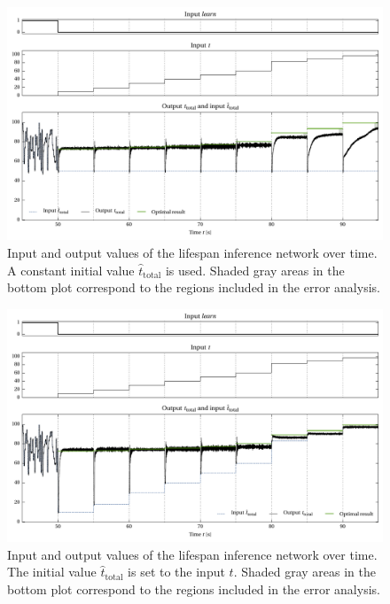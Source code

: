 \documentclass[a4paper,11pt]{article}
\begin{document}
\begin{figure}
	\centering
	\includegraphics{media/net_lifespan_gaussian_10_const_0.pdf}
	\caption{Input and output values of the lifespan inference network over time. A constant initial value $\hat t_\mathrm{total}$ is used. Shaded gray areas in the bottom plot correspond to the regions included in the error analysis.}
	\label{fig:net_lifespan_const}
\end{figure}
\begin{figure}
	\centering
	\includegraphics{media/net_lifespan_gaussian_10_t_0.pdf}
	\caption{Input and output values of the lifespan inference network over time. The initial value $\hat t_\mathrm{total}$ is set to the input $t$. Shaded gray areas in the bottom plot correspond to the regions included in the error analysis.}
	\label{fig:net_lifespan_t}
\end{figure}
\end{document}
